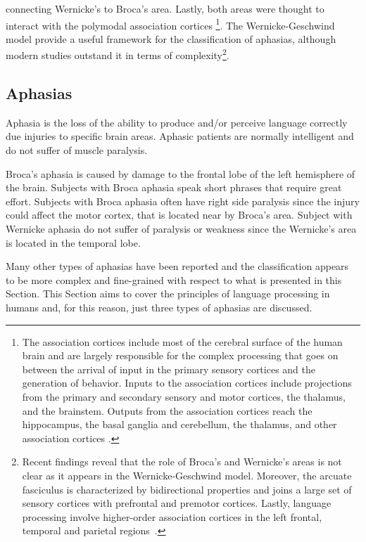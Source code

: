 connecting Wernicke's to Broca's area. 
Lastly, both areas were thought to interact with the polymodal association
cortices \footnote{The association cortices include most of the cerebral
surface of the 
human brain and are largely responsible for the complex processing that goes 
on between the arrival of input in the primary sensory cortices and the 
generation of behavior. 
Inputs to the association cortices include projections from the primary and
secondary sensory and motor cortices, the thalamus, and the brainstem. 
Outputs from the association cortices reach the hippocampus, the basal ganglia
and cerebellum, the thalamus, and other association cortices
\citep{purves.etal:2001}.}.
The Wernicke-Geschwind model provide a useful framework for the classification
of aphasias, although modern studies outstand it in terms of 
complexity\footnote{Recent findings reveal that the role of Broca's and 
Wernicke's areas is not clear as it appears in the Wernicke-Geschwind model.
Moreover, the arcuate  fasciculus is characterized by bidirectional properties
and joins a large set of sensory cortices with prefrontal and premotor cortices.
Lastly, language processing involve higher-order association cortices in the 
left frontal, temporal and parietal 
regions~\citep{kandel.schwartz.jessel:2000}.}.
\subsection{Aphasias}
\label{sec:speech:language:aphasias}
Aphasia is the loss of the ability to produce and/or perceive language correctly
due injuries to specific brain areas. Aphasic patients are normally intelligent
and do not suffer of muscle paralysis.

Broca's aphasia is caused by damage to the frontal lobe of the left hemisphere
of the brain. Subjects with Broca aphasia speak short phrases that require great
effort. 
Subjects with Broca aphasia often have right side paralysis since the injury 
could affect the motor cortex, that is located near by Broca's area.
Subject with Wernicke aphasia do not suffer of paralysis or weakness since the
Wernicke's area is located in the temporal lobe.

Many other types of aphasias have been reported and the classification appears
to be more complex and fine-grained with respect to what is presented in this
Section.
This Section aims to cover the principles of language processing in humans and,
for this reason, just three types of aphasias are discussed.
